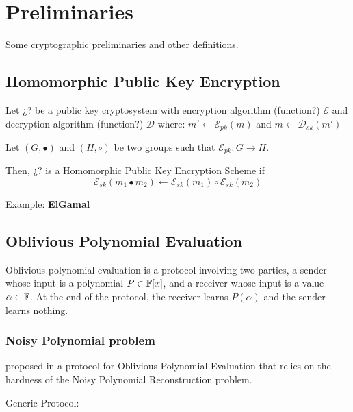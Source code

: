 \chapter{Preliminaries}

Some cryptographic preliminaries and other definitions.

\section{Homomorphic Public Key Encryption}
Let ¿? be a public key cryptosystem with encryption algorithm (function?) $\mathcal{E}$ and decryption algorithm (function?) $\mathcal{D}$ where:
$m' \leftarrow \mathcal{E}_{pk} (m)$ and $m \leftarrow \mathcal{D}_{sk} (m')$

Let $(G,\bullet)$ and $(H,\circ)$ be two groups such that $\mathcal{E}_{pk}: G \rightarrow H$.

Then, ¿? is a Homomorphic Public Key Encryption Scheme if
$$ \mathcal{E}_{sk} (m_1 \bullet m_2) \leftarrow \mathcal{E}_{sk} (m_1) \circ \mathcal{E}_{sk} (m_2)$$

Example:
\textbf{ElGamal}


\section{Oblivious Polynomial Evaluation}
Oblivious polynomial evaluation is a protocol involving two parties, a sender whose input is a polynomial $P \in {\mathbb F}[x]$, and a receiver whose input is a value $\alpha \in {\mathbb F}$. At the end of the protocol, the receiver learns $P(\alpha)$ and the sender learns nothing.

\subsection{Noisy Polynomial problem}

\citeauthor{OPE} proposed in \cite{OPE} a protocol for Oblivious Polynomial Evaluation that relies on the hardness of the Noisy Polynomial Reconstruction problem.

Generic Protocol:


